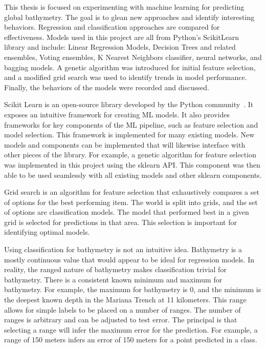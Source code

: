 \par
This thesis is focused on experimenting with machine learning for predicting global bathymetry.
The goal is to glean new approaches and identify interesting behaviors.
Regression and classification approaches are compared for effectiveness.
Models used in this project are all from Python's ScikitLearn library and include: Linear Regression Models, Decision Trees and related ensembles, Voting ensembles, K Nearest Neighbors classifier, neural networks, and bagging models.
A genetic algorithm was introduced for initial feature selection, and a modified grid search was used to identify trends in model performance.
Finally, the behaviors of the models were recorded and discussed.

\par
Scikit Learn is an open-source library developed by the Python community~\cite{scikit-learn}.
It exposes an intuitive framework for creating \ac{ML} models.
It also provides frameworks for key components of the \ac{ML} pipeline, such as feature selection and model selection.
This framework is implemented for many existing models.
New models and components can be implemented that will likewise interface with other pieces of the library.
For example, a genetic algorithm for feature selection was implemented in this project using the sklearn \ac{API}.
This component was then able to be used seamlessly with all existing models and other sklearn components.

\par
Grid search is an algorithm for feature selection that exhaustively compares a set of options for the best performing item.
The world is split into grids, and the set of options are classification models.
The model that performed best in a given grid is selected for predictions in that area.
This selection is important for identifying optimal models.


\par
Using classification for bathymetry is not an intuitive idea.
Bathymetry is a mostly continuous value that would appear to be ideal for regression models.
In reality, the ranged nature of bathymetry makes classification trivial for bathymetry.
There is a consistent known minimum and maximum for bathymetry.
For example, the maximum for bathymetry is 0, and the minimum is the deepest known depth in the Mariana Trench at 11 kilometers.
This range allows for simple labels to be placed on a number of ranges.
The number of ranges is arbitrary and can be adjusted to test error.
The principal is that selecting a range will infer the maximum error for the prediction.
For example, a range of 150 meters infers an error of 150 meters for a point predicted in a class.




